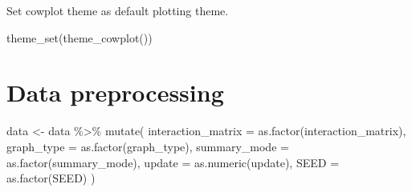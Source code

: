 \documentclass[
]{book}
\newenvironment{Shaded}{\begin{snugshade}}{\end{snugshade}}
\newcommand{\AttributeTok}[1]{\textcolor[rgb]{0.77,0.63,0.00}{#1}}
\newcommand{\FunctionTok}[1]{\textcolor[rgb]{0.00,0.00,0.00}{#1}}
\newcommand{\NormalTok}[1]{#1}
\newcommand{\OtherTok}[1]{\textcolor[rgb]{0.56,0.35,0.01}{#1}}
\newcommand{\SpecialCharTok}[1]{\textcolor[rgb]{0.00,0.00,0.00}{#1}}
\begin{document}
Set cowplot theme as default plotting theme.

\begin{Shaded}
\begin{Highlighting}[]
\FunctionTok{theme\_set}\NormalTok{(}\FunctionTok{theme\_cowplot}\NormalTok{())}
\end{Highlighting}
\end{Shaded}

\hypertarget{data-preprocessing}{%
\section{Data preprocessing}\label{data-preprocessing}}

\begin{Shaded}
\begin{Highlighting}[]
\NormalTok{data }\OtherTok{\textless{}{-}}\NormalTok{ data }\SpecialCharTok{\%\textgreater{}\%}
  \FunctionTok{mutate}\NormalTok{(}
    \AttributeTok{interaction\_matrix =} \FunctionTok{as.factor}\NormalTok{(interaction\_matrix),}
    \AttributeTok{graph\_type =} \FunctionTok{as.factor}\NormalTok{(graph\_type),}
    \AttributeTok{summary\_mode =} \FunctionTok{as.factor}\NormalTok{(summary\_mode),}
    \AttributeTok{update =} \FunctionTok{as.numeric}\NormalTok{(update),}
    \AttributeTok{SEED =} \FunctionTok{as.factor}\NormalTok{(SEED)}
\NormalTok{  )}


\end{Highlighting}
\end{Shaded}
\end{document}
